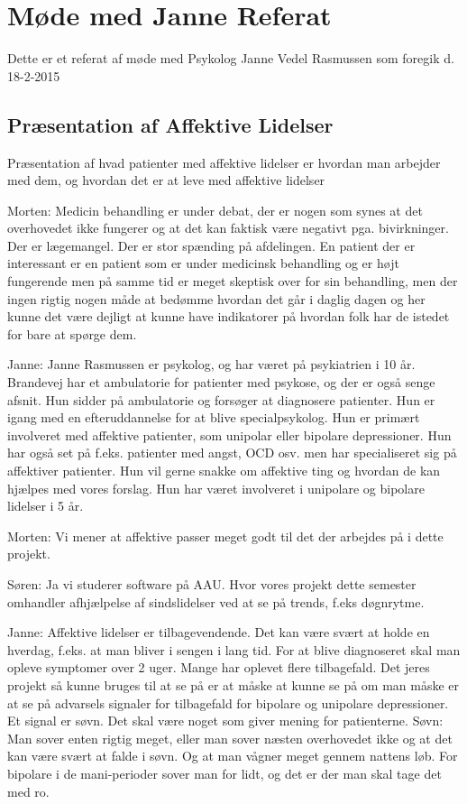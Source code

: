 \chapter{Møde med Janne Referat}\label{app:moede-med-janne-referat}
Dette er et referat af møde med Psykolog Janne Vedel Rasmussen som foregik d. 18-2-2015

\section{Præsentation af Affektive Lidelser}
Præsentation af hvad patienter med affektive lidelser er hvordan man arbejder med dem, og hvordan det er at leve med affektive lidelser

Morten: Medicin behandling er under debat, der er nogen som synes at det overhovedet ikke fungerer og at det kan faktisk være negativt pga. bivirkninger. Der er lægemangel. Der er stor spænding på afdelingen. En patient der er interessant er en patient som er under medicinsk behandling og er højt fungerende men på samme tid er meget skeptisk over for sin behandling, men der ingen rigtig nogen måde at bedømme hvordan det går i daglig dagen og her kunne det være dejligt at kunne have indikatorer på hvordan folk har de istedet for bare at spørge dem. 

Janne: Janne Rasmussen er psykolog, og har været på psykiatrien i 10 år. Brandevej har et ambulatorie for patienter med psykose, og der er også senge afsnit. Hun sidder på ambulatorie og forsøger at diagnosere patienter. Hun er igang med en efteruddannelse for at blive specialpsykolog. Hun er primært involveret med affektive patienter, som unipolar eller bipolare depressioner. Hun har også set på f.eks. patienter med angst, OCD osv. men har specialiseret sig på affektiver patienter. Hun vil gerne snakke om affektive ting og hvordan de kan hjælpes med vores forslag. Hun har været involveret i unipolare og bipolare lidelser i 5 år. 

Morten: Vi mener at affektive passer meget godt til det der arbejdes på i dette projekt. 

Søren: Ja vi studerer software på AAU. Hvor vores projekt dette semester omhandler afhjælpelse af sindslidelser ved at se på trends, f.eks døgnrytme.

Janne: Affektive lidelser er tilbagevendende. Det kan være svært at holde en hverdag, f.eks. at man bliver i sengen i lang tid. For at blive diagnoseret skal man opleve symptomer over 2 uger. Mange har oplevet flere tilbagefald. Det jeres projekt så kunne bruges til at se på er at måske at kunne se på om man måske er at se på advarsels signaler for tilbagefald for bipolare og unipolare depressioner. Et signal er søvn. Det skal være noget som giver mening for patienterne. Søvn: Man sover enten rigtig meget, eller man sover næsten overhovedet ikke og at det kan være svært at falde i søvn. Og at man vågner meget gennem nattens løb. For bipolare i de mani-perioder sover man for lidt, og det er der man skal tage det med ro. 

